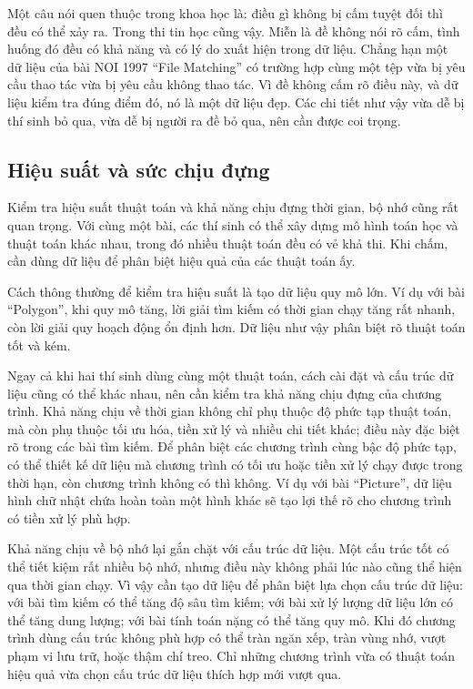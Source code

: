 \documentclass[11pt]{article}
\begin{document}
Một câu nói quen thuộc trong khoa học là: điều gì không bị cấm tuyệt đối thì
đều có thể xảy ra. Trong thi tin học cũng vậy. Miễn là đề không nói rõ cấm,
tình huống đó đều có khả năng và có lý do xuất hiện trong dữ liệu. Chẳng hạn
một dữ liệu của bài NOI 1997 ``File Matching'' có trường hợp cùng một tệp vừa
bị yêu cầu thao tác vừa bị yêu cầu không thao tác. Vì đề không cấm rõ điều
này, và dữ liệu kiểm tra đúng điểm đó, nó là một dữ liệu đẹp. Các chi tiết như
vậy vừa dễ bị thí sinh bỏ qua, vừa dễ bị người ra đề bỏ qua, nên cần được coi
trọng.

\subsection{Hiệu suất và sức chịu đựng}

Kiểm tra hiệu suất thuật toán và khả năng chịu đựng thời gian, bộ nhớ cũng rất
quan trọng. Với cùng một bài, các thí sinh có thể xây dựng mô hình toán học và
thuật toán khác nhau, trong đó nhiều thuật toán đều có vẻ khả thi. Khi chấm,
cần dùng dữ liệu để phân biệt hiệu quả của các thuật toán ấy.

Cách thông thường để kiểm tra hiệu suất là tạo dữ liệu quy mô lớn. Ví dụ với
bài ``Polygon'', khi quy mô tăng, lời giải tìm kiếm có thời gian chạy tăng rất
nhanh, còn lời giải quy hoạch động ổn định hơn. Dữ liệu như vậy phân biệt rõ
thuật toán tốt và kém.

Ngay cả khi hai thí sinh dùng cùng một thuật toán, cách cài đặt và cấu trúc dữ
liệu cũng có thể khác nhau, nên cần kiểm tra khả năng chịu đựng của chương
trình. Khả năng chịu về thời gian không chỉ phụ thuộc độ phức tạp thuật toán,
mà còn phụ thuộc tối ưu hóa, tiền xử lý và nhiều chi tiết khác; điều này đặc
biệt rõ trong các bài tìm kiếm. Để phân biệt các chương trình cùng bậc độ
phức tạp, có thể thiết kế dữ liệu mà chương trình có tối ưu hoặc tiền xử lý
chạy được trong thời hạn, còn chương trình không có thì không. Ví dụ với bài
``Picture'', dữ liệu hình chữ nhật chứa hoàn toàn một hình khác sẽ tạo lợi thế
rõ cho chương trình có tiền xử lý phù hợp.

Khả năng chịu về bộ nhớ lại gắn chặt với cấu trúc dữ liệu. Một cấu trúc tốt
có thể tiết kiệm rất nhiều bộ nhớ, nhưng điều này không phải lúc nào cũng thể
hiện qua thời gian chạy. Vì vậy cần tạo dữ liệu để phân biệt lựa chọn cấu trúc
dữ liệu: với bài tìm kiếm có thể tăng độ sâu tìm kiếm; với bài xử lý lượng dữ
liệu lớn có thể tăng dung lượng; với bài tính toán nặng có thể tăng quy mô.
Khi đó chương trình dùng cấu trúc không phù hợp có thể tràn ngăn xếp, tràn
vùng nhớ, vượt phạm vi lưu trữ, hoặc thậm chí treo. Chỉ những chương trình vừa
có thuật toán hiệu quả vừa chọn cấu trúc dữ liệu thích hợp mới vượt qua.
\end{document}
